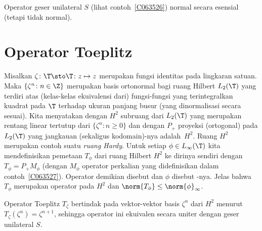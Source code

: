 \begin{exam} Operator geser unilateral $S$ (lihat contoh~\ref{C063526})
normal secara esensial (tetapi tidak normal).
\end{exam}





















\section{Operator Toeplitz}
\begin{defn} Misalkan
$\zeta\colon \T \sto \T\colon z \mapsto z$ merupakan fungsi identitas pada lingkaran satuan.
Maka $\{\zeta^n\colon n \in \Z\}$ merupakan basis ortonormal bagi ruang Hilbert $L_2(\T)$ yang terdiri atas
(kelas-kelas ekuivalensi dari) fungsi-fungsi yang terintegralkan kuadrat pada $\T$ terhadap ukuran panjang
busur (yang dinormalisasi secara sesuai). Kita menyatakan dengan $H^2$ subruang dari $L_2(\T)$ yang merupakan
rentang linear tertutup dari $\{\zeta^n\colon n \ge 0\}$ dan dengan $P_+$ proyeksi
(ortogonal) pada $L_2(\T)$ yang jangkauan
(sekaligus kodomain)-nya adalah~$H^2$. Ruang $H^2$ merupakan
contoh suatu
\emph{ruang Hardy}. Untuk setiap $\phi \in L_\infty(\T)$ kita mendefinisikan pemetaan $T_\phi$ dari
ruang Hilbert $H^2$ ke dirinya sendiri dengan $T_\phi = P_+M_\phi$ (dengan $M_\phi$ operator
perkalian yang didefinisikan dalam contoh~\ref{C063527}). Operator demikian disebut
 dan $\phi$ disebut
-nya. Jelas bahwa $T_\phi$ merupakan operator pada $H^2$ dan $\norm{T_\phi} \le \norm
{\phi}_\infty$.
\end{defn}

\begin{exam} Operator Toeplitz $T_\zeta$
bertindak pada vektor-vektor basis $\zeta^n$ dari $H^2$ menurut $T_\zeta(\zeta^n) = \zeta^{n+1}$, sehingga operator ini
ekuivalen secara uniter dengan geser unilateral $S$.
\end{exam}

